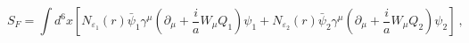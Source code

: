\begin{equation}
S_F = \int d^6 x\left[ N_{\varepsilon_1}(r) \bar\psi_1\gamma^\mu
(\partial_\mu + \frac{i}{a}W_\mu Q_1)\psi_1 + N_{\varepsilon_2}(r)
\bar\psi_2\gamma^\mu (\partial_\mu + \frac{i}{a}W_\mu
Q_2)\psi_2\right]~,
\label{SF}
\end{equation}

